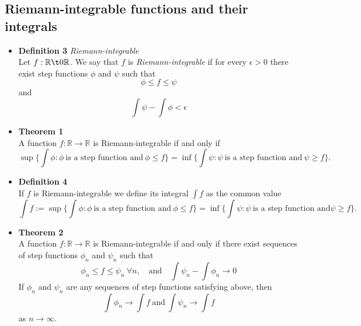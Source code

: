 \documentclass[11pt,a4paper]{article}
\begin{document}
\subsection{Riemann-integrable functions and their integrals}

\begin{itemize}
    \item \textbf{Definition 3} \emph{Riemann-integrable} \\
        Let $f : \mathbb{R} \t0 \mathbb{R}$.
        We say that $f$ is \emph{Riemann-integrable} if for every $\epsilon > 0$
        there exist step functions $\phi$ and $\psi$ such that
        \[
            \phi \leq f \leq \psi
        \]
        and
        \[
            \int \psi - \int \phi < \epsilon
        \]

    \item \textbf{Theorem 1} \\
        A function $f : \mathbb{R} \to \mathbb{R}$ is Riemann-integrable if and only if
        \[
            \sup \{ \int \phi : \phi \ \text{is a step function and} \ \phi \leq f \} =
            \inf \{ \int \psi : \psi \ \text{is a step function and} \ \psi \geq f \}.
        \]

    \item \textbf{Definition 4} \\
        If $f$ is Riemann-integrable we define its integral $\int f$ as the common value
        \[
            \int f := \sup \{ \int \phi : \phi \ \text{is a step function and} \ \phi \leq f \}
            = \inf \{ \int \psi : \psi \ \text{is a step function and} \psi \geq f \}.
        \]

    \item \textbf{Theorem 2} \\
        A function $f : \mathbb{R} \to \mathbb{R}$ is Riemann-integrable if and only if there
        exist sequences of step functions $\phi_n$ and $\psi_n$ such that
        \[
            \phi_n \leq f \leq \psi_n \ \forall n, \quad \text{and} \quad
            \int \psi_n - \int \phi_n \to 0
        \]
        If $\phi_n$ and $\psi_n$ are any sequences of step functions satisfying above, then
        \[
            \int \phi_n \to \int f \ \text{and} \ \int \psi_n \to \int f
        \]
        as $n \to \infty$.


\end{itemize}
\end{document}
